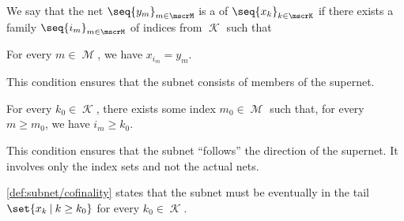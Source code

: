 \begin{definition}\label{def:subnet}
  We say that the net \( \seq{ y_m }_{m \in \mscrM} \) is a  of \( \seq{ x_k }_{k \in \mscrK} \) if there exists a family \( \seq{ i_m }_{m \in \mscrM} \) of indices from \( \mscrK \) such that
  \begin{thmenum}
     For every \( m \in \mscrM \), we have \( x_{i_m} = y_m \).

    This condition ensures that the subnet consists of members of the supernet.

     For every \( k_0 \in \mscrK \), there exists some index \( m_0 \in \mscrM \) such that, for every \( m \geq m_0 \), we have \( i_m \geq k_0 \).

    This condition ensures that the subnet \enquote{follows} the direction of the supernet. It involves only the index sets and not the actual nets.
  \end{thmenum}
\end{definition}
\begin{comments}
  \item \ref{def:subnet/cofinality} states that the subnet must be eventually in the tail \( \set{ x_k \given k \geq k_0 } \) for every \( k_0 \in \mscrK \).
\end{comments}

